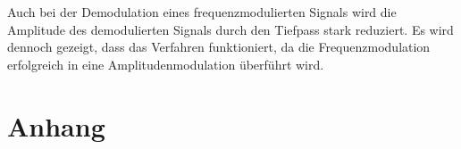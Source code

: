 Auch bei der Demodulation eines frequenzmodulierten Signals wird die Amplitude des demodulierten Signals durch den Tiefpass stark reduziert. Es wird dennoch gezeigt, dass das Verfahren funktioniert, da die Frequenzmodulation erfolgreich in eine Amplitudenmodulation überführt wird.

\printbibliography

\FloatBarrier

\section{Anhang}



\FloatBarrier
